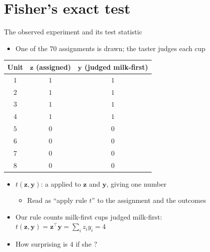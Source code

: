 \documentclass[table, xcolor = {dvipsnames}, 9pt]{beamer}
\theoremstyle{plain}
\newcommand{\mh}[1]{{\color{magenta}{#1}}}
\begin{document}
\section{Fisher's exact test}

\begin{frame}{The observed experiment and its test statistic}
\vfill
\begin{itemize} \vfill
\item One of the $70$ assignments is drawn; the taster judges each cup \vfill
\end{itemize} \vfill
\begin{table}[H]
\centering
\small
\begin{tabular}{c|cc}
\toprule
Unit & $\bm{z}$ (assigned) & $\bm{y}$ (judged milk-first) \\
  \midrule
$1$ & $1$ & $1$ \\
$2$ & $1$ & $1$ \\
$3$ & $1$ & $1$ \\
$4$ & $1$ & $1$ \\
$5$ & $0$ & $0$ \\
$6$ & $0$ & $0$ \\
$7$ & $0$ & $0$ \\
$8$ & $0$ & $0$
\end{tabular}
\end{table}
\vspace{-0.5em}
\begin{itemize} \vfill
\item \mh{Test statistic} $t(\bm{z},\bm{y})$: a \mh{rule} applied to $\bm{z}$ and $\bm{y}$, giving one number \vfill
\begin{itemize} \vfill 
\item[] Read as ``apply rule $t$'' to the assignment and the outcomes \vfill
\end{itemize} \vfill 
\item Our rule counts milk-first cups judged milk-first: $t(\bm{z},\bm{y}) = \bm{z}^{\top}\bm{y} = \sum_{i} z_i y_i = 4$ \vfill
\item How surprising is $4$ if she \mh{cannot discriminate}? \vfill
\end{itemize} \vfill
\end{frame}
\end{document}
